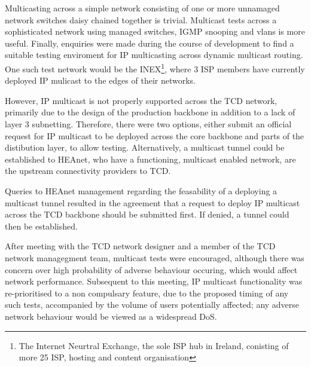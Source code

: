 Multicasting across a simple network consisting of one or 
more unnamaged network switches daisy chained together is trivial. 
Multicast tests across a sophisticated network using managed
switches, IGMP snooping and vlans is more useful. Finally, enquiries
were made during the course of development to find a suitable testing
enviroment for IP multicasting across dynamic multicast routing. One
such test network would be the INEX\footnote{The Internet Neurtral
Exchange, the sole ISP hub in Ireland, conisting of more
25 ISP, hosting and content organisation}, where 3 ISP members 
have currently deployed IP mulicast to the edges of their networks.


However, IP multicast is not properly supported across the 
TCD network, primarily due to the design of the production backbone in 
addition to a lack of layer 3 subnetting. Therefore, there were two 
options, either submit an official request for IP multicast to be 
deployed across the core backbone and parts of the distibution layer, 
to allow testing. Alternatively, a multicast tunnel could be established
to HEAnet, who have a functioning, multicast enabled network, are the 
upstream connectivity providers to TCD. 


Queries to HEAnet management regarding the feasability of a deploying
a multicast tunnel resulted in the agreement that a request to deploy IP
multicast across the TCD backbone should be submitted first. If denied,
a tunnel could then be established. 


After meeting with the TCD network designer and a member of the TCD 
network managegment team, multicast tests were encouraged, although 
there was concern over high probability of adverse behaviour occuring, 
which would affect network performance. Subsequent to this meeting, 
IP multicast functionality was re-prioritised to a non compulsary
feature, due to the proposed timing of any such tests, accompanied by 
the volume of users potentially affected; any adverse network behaviour 
would be viewed as a widespread DoS. 
